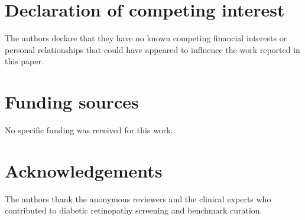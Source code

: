\documentclass[a4paper,fleqn]{cas-dc}
\begin{document}
\section*{Declaration of competing interest}
The authors declare that they have no known competing financial interests or personal relationships that could have appeared to influence the work reported in this paper.

\section*{Funding sources}
No specific funding was received for this work.

\section*{Acknowledgements}
The authors thank the anonymous reviewers and the clinical experts who contributed to diabetic retinopathy screening and benchmark curation.


\end{document}
